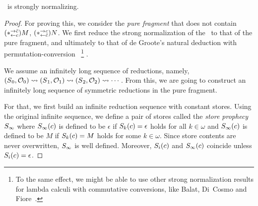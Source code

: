\begin{theorem}
 \label{first:sn}
 \lgd\, is strongly normalizing.
\end{theorem}
\begin{proof}
For proving this, we consider the \textit{pure fragment}
 that does not contain
$(\ast^{\rightarrow {\bar{c}}}_{\leftarrow{c}})M$, $(\ast^{\rightarrow {c}}_{\leftarrow{\bar{c}}})N$.
We first reduce the strong
normalization of the \lgd\, to that of the pure fragment, and
ultimately to that of de Groote's
natural deduction with permutation-conversion~\cite{Philippe2002js}%
\footnote{
To the
same effect, we might be able to use other strong normalization
 results for lambda calculi with commutative conversions, like Balat,
 Di~Cosmo
 and Fiore~\cite{bdf}.
}%
.

We assume an infinitely long sequence of reductions, namely,
$
({S}{_0},{\mathcal{O}_0})
\rightsquigarrow
({S}{_1},{\mathcal{O}_1})
\rightsquigarrow
({S}{_2},{\mathcal{O}_2})
\rightsquigarrow\cdots
$.
From this, we are going to construct an infinitely long sequence of
symmetric reductions in the pure fragment.

For that, we first
build an infinite reduction sequence with constant stores.
Using the original infinite sequence, we define a pair of stores called the
\textit{store prophecy} ${S}_\infty$ where
$ {S}_\infty(c)$ is defined to be $\epsilon$ if
 ${S}_k(c)=\epsilon$ holds for all
 $k\in\omega$ and
$ {S}_\infty(c) $ is defined to be $M $ if ${S}_k(c)=M$ holds for some $k\in\omega$.
Since store contents are never overwritten,
${S}_\infty$ is well defined.
Moreover,
${S}_i(c)$ and ${S}_\infty(c)$ coincide unless
${S}_i(c)=\epsilon$.


\end{proof}
